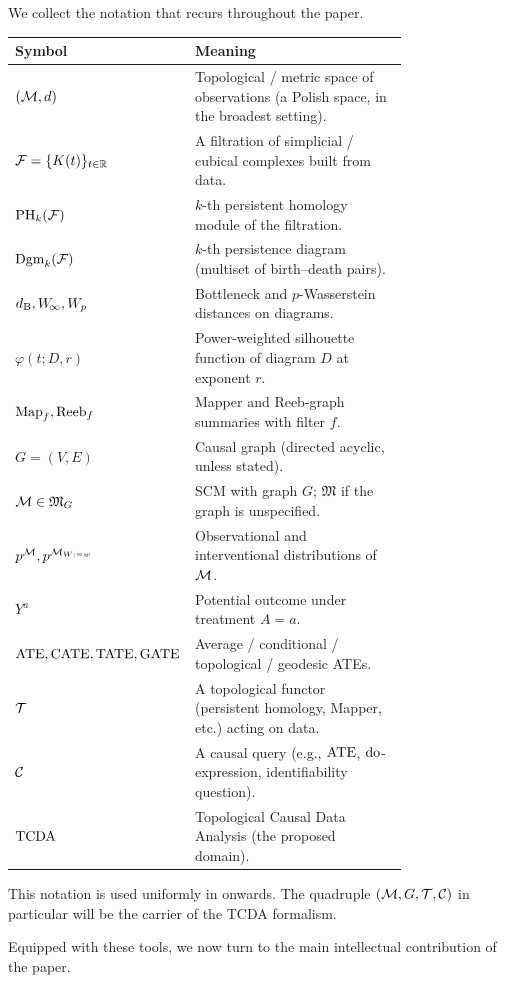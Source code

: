 We collect the notation that recurs throughout the paper.

\begin{center}
\begin{tabular}{@{}lp{0.78\linewidth}@{}}
\toprule
Symbol & Meaning \\
\midrule
$(\mathcal{M}, d)$       & Topological / metric space of observations (a Polish space, in the broadest setting). \\
$\mathcal{F} = \{K(t)\}_{t \in \mathbb{R}}$ & A filtration of simplicial / cubical complexes built from data. \\
$\mathrm{PH}_{k}(\mathcal{F})$ & $k$-th persistent homology module of the filtration. \\
$\mathrm{Dgm}_k(\mathcal{F})$  & $k$-th persistence diagram (multiset of birth--death pairs). \\
$d_{\mathrm{B}}, W_{\!\infty}, W_p$  & Bottleneck and $p$-Wasserstein distances on diagrams. \\
$\varphi(t; D, r)$ & Power-weighted silhouette function of diagram $D$ at exponent $r$. \\
$\mathrm{Map}_f, \mathrm{Reeb}_f$ & Mapper and Reeb-graph summaries with filter $f$. \\
$G = (V, E)$     & Causal graph (directed acyclic, unless stated). \\
$\mathcal{M} \in \mathfrak{M}_G$ & SCM with graph $G$; $\mathfrak{M}$ if the graph is unspecified. \\
$p^{\mathcal{M}}, p^{\mathcal{M}_{W := w}}$ & Observational and interventional distributions of $\mathcal{M}$. \\
$Y^a$             & Potential outcome under treatment $A = a$. \\
$\operatorname{ATE}, \operatorname{CATE}, \operatorname{TATE}, \operatorname{GATE}$ & Average / conditional / topological / geodesic ATEs. \\
$\mathcal{T}$            & A topological functor (persistent homology, Mapper, etc.) acting on data. \\
$\mathcal{C}$            & A causal query (e.g., $\operatorname{ATE}$, $\mathrm{do}$-expression, identifiability question). \\
$\mathrm{TCDA}$          & Topological Causal Data Analysis (the proposed domain). \\
\bottomrule
\end{tabular}
\end{center}

This notation is used uniformly in  onwards. The
quadruple $(\mathcal{M}, G, \mathcal{T}, \mathcal{C})$ in particular will be the carrier of the
TCDA formalism.

\medskip

Equipped with these tools, we now turn to the main intellectual
contribution of the paper.
